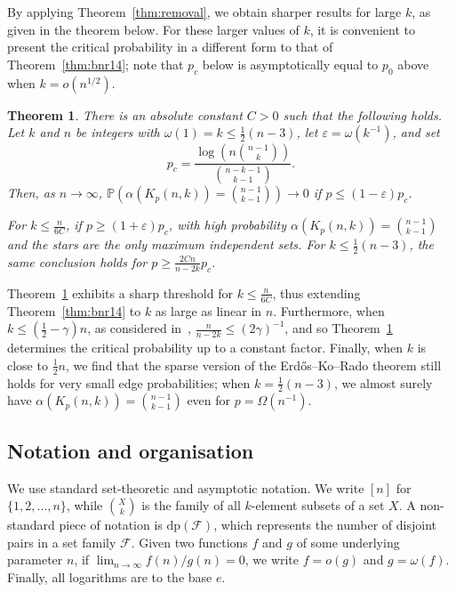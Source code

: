 \documentclass[11pt]{article}
\newtheorem{theorem}{Theorem}[section]
\theoremstyle{definition}
\newcommand{\eps}{\varepsilon}
\newcommand{\cF}{\mathcal{F}}
\newcommand{\3}{\bf{3}}
\newcommand{\disj}{\mathrm{dp}}
\newcommand{\Prb}{\mathbb{P}}
\begin{document}
By applying Theorem~\ref{thm:removal}, we obtain sharper results for large $k$, as given in the theorem below.  For these larger values of $k$, it is convenient to present the critical probability in a different form to that of Theorem~\ref{thm:bnr14}; note that $p_c$ below is asymptotically equal to $p_0$ above when $k = o(n^{1/2})$.

\begin{theorem} \label{thm:sparseEKR}
There is an absolute constant $C > 0$ such that the following holds.  Let $k$ and $n$ be integers with $\omega(1) = k \le \tfrac12 (n-3)$, let $\eps = \omega(k^{-1})$, and set
\[ p_c = \frac{\log \left( n \binom{n-1}{k} \right) }{\binom{n-k-1}{k-1}}. \]
Then, as $n \rightarrow \infty$, $\Prb \left( \alpha(K_p(n,k)) = \binom{n-1}{k-1} \right) \rightarrow 0$ if ${p \le (1 - \eps) p_c}$.

For $k \le \frac{n}{6C}$, if ${p \ge (1 + \eps) p_c}$, with high probability $\alpha(K_p(n,k)) = \binom{n-1}{k-1}$ and the stars are the only maximum independent sets.  For $k \le \tfrac12 (n-3)$, the same conclusion holds for $p \ge \frac{2Cn}{n-2k} p_c$.
\end{theorem}

Theorem~\ref{thm:sparseEKR} exhibits a sharp threshold for $k \le \frac{n}{6C}$, thus extending Theorem~\ref{thm:bnr14} to $k$ as large as linear in $n$.  Furthermore, when $k \le (\tfrac12 - \gamma)n$, as considered in~\cite{bbn14}, $\frac{n}{n-2k} \le (2\gamma)^{-1}$, and so Theorem~\ref{thm:sparseEKR} determines the critical probability up to a constant factor.  Finally, when $k$ is close to $\tfrac12 n$, we find that the sparse version of the Erd\H{o}s--Ko--Rado theorem still holds for very small edge probabilities; when $k = \tfrac12 (n-3)$, we almost surely have $\alpha(K_p(n,k)) = \binom{n-1}{k-1}$ even for $p = \Omega(n^{-1})$.

\subsection{Notation and organisation} \label{subsec:intro4}

We use standard set-theoretic and asymptotic notation.  We write $[n]$ for $\{1, 2, \hdots, n\}$, while $\binom{X}{k}$ is the family of all $k$-element subsets of a set $X$.  A non-standard piece of notation is $\disj(\cF)$, which represents the number of disjoint pairs in a set family $\cF$.  Given two functions $f$ and $g$ of some underlying parameter $n$, if $\lim_{n \rightarrow \infty} f(n) / g(n) = 0$, we write $f = o(g)$ and $g = \omega(f)$.  Finally, all logarithms are to the base $e$.
\end{document}
